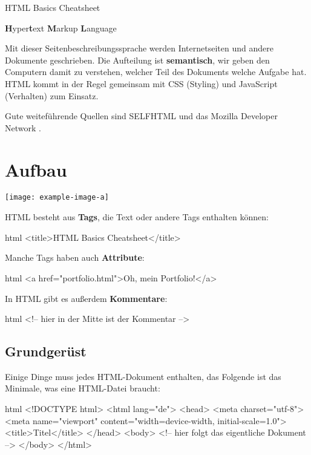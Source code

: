 \documentclass[10pt,a4paper]{article}
\begin{document}
{\color{accentcolor}HTML Basics Cheatsheet}

\begin{multicols}{3}

\scriptsize

\textbf{H}yper\textbf{t}ext \textbf{M}arkup \textbf{L}anguage

Mit dieser Seitenbeschreibungssprache werden Internetseiten und andere Dokumente geschrieben. Die Aufteilung ist \textbf{semantisch}, wir geben den Computern damit zu verstehen, welcher Teil des Dokuments welche Aufgabe hat. HTML kommt in der Regel gemeinsam mit CSS (Styling) und JavaScript (Verhalten) zum Einsatz.

Gute weiteführende Quellen sind SELFHTML \cite{selfhtml} und das Mozilla Developer Network \cite{mdn}.

\section*{Aufbau}

\texttt{[image: example-image-a]}

HTML besteht aus \textbf{Tags}, die Text oder andere Tags enthalten können:
\begin{codebox}{html}{}
<title>HTML Basics Cheatsheet</title>
\end{codebox}

Manche Tags haben auch \textbf{Attribute}:
\begin{codebox}{html}{}
<a href="portfolio.html">Oh, mein Portfolio!</a>
\end{codebox}

In HTML gibt es außerdem \textbf{Kommentare}:
\begin{codebox}{html}{}
<!-- hier in der Mitte ist der Kommentar -->
\end{codebox}


\subsection*{Grundgerüst}
Einige Dinge muss jedes HTML-Dokument enthalten, das Folgende ist das Minimale, was eine HTML-Datei braucht:
\begin{codebox}{html}{}
<!DOCTYPE html>
<html lang="de">
  <head>
    <meta charset="utf-8">
    <meta name="viewport" content="width=device-width, initial-scale=1.0">
    <title>Titel</title>
  </head>
  <body>
    <!-- hier folgt das eigentliche Dokument -->
  </body>
</html>
\end{codebox}



\end{multicols}
\end{document}
